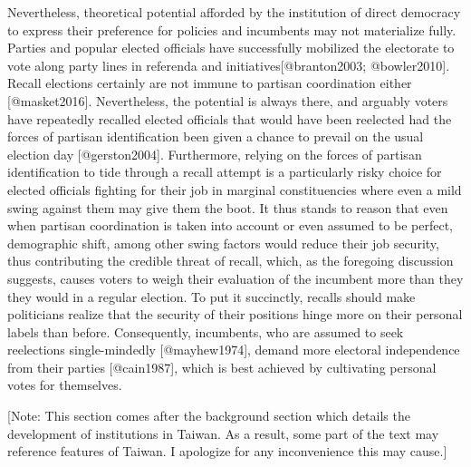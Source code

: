 \documentclass[hyphens, crop=false]{standalone}
\begin{document}
	Nevertheless,
	theoretical potential afforded by the institution of direct democracy to express their preference for policies and incumbents may not materialize fully.
	Parties and popular elected officials have successfully mobilized the electorate to vote along party lines in referenda and initiatives[@branton2003; @bowler2010].
	Recall elections certainly are not immune to partisan coordination either [@masket2016].
	Nevertheless,
	the potential is always there,
	and arguably voters have repeatedly recalled elected officials
	that would have been reelected had the forces of partisan identification been given a chance to prevail on the usual election day [@gerston2004].
	Furthermore,
	relying on the forces of partisan identification to tide through a recall attempt is a particularly risky choice
	for elected officials fighting for their job in marginal constituencies where even a mild swing against them may give them the boot.
	It thus stands to reason that even when partisan coordination is taken into account or even assumed to be perfect,
	demographic shift,
	among other swing factors would reduce their job security,
	thus contributing the credible threat of recall,
	which,
	as the foregoing discussion suggests,
	causes voters to weigh their evaluation of the incumbent more than they they would in a regular election.
	To put it succinctly, recalls should make politicians realize that the security of their positions hinge more on their personal labels than before.
	Consequently,
	incumbents,
	who are assumed to seek reelections single-mindedly [@mayhew1974],
	demand more electoral independence from their parties [@cain1987],
	which is best achieved by cultivating personal votes for themselves.
	
	[Note: This section comes after the background section which details the development of
	institutions in Taiwan. As a result, some part of the text may reference
	features of Taiwan. I apologize for any inconvenience this may cause.]
\end{document}
